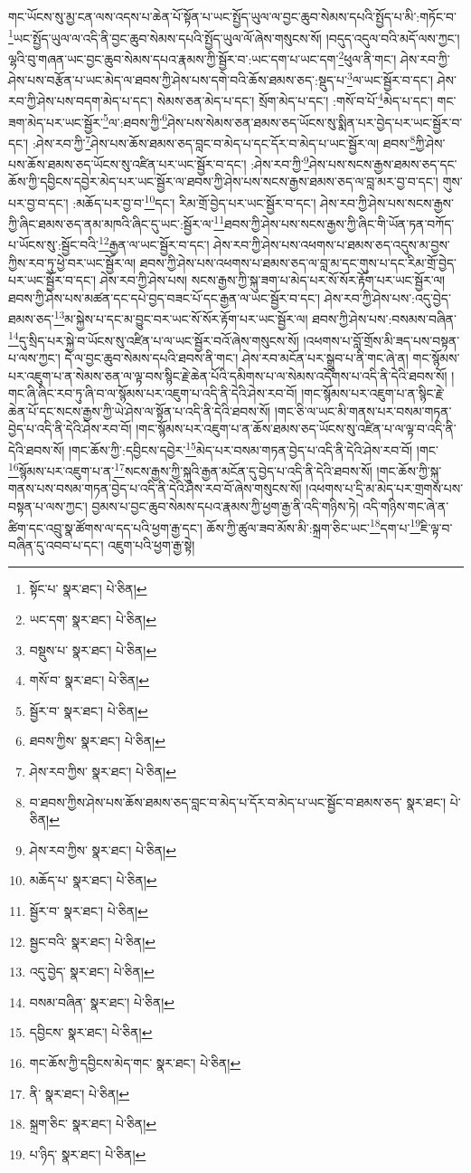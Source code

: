 གང་ཡོངས་སུ་མྱ་ངན་ལས་འདས་པ་ཆེན་པོ་སྟོན་པ་ཡང་སྤྱོད་ཡུལ་ལ་བྱང་ཆུབ་སེམས་དཔའི་སྤྱོད་པ་མི་:གཏོང་བ་\footnote{སྟོང་པ་  སྣར་ཐང་།  པེ་ཅིན། }ཡང་སྤྱོད་ཡུལ་ལ་འདི་ནི་བྱང་ཆུབ་སེམས་དཔའི་སྤྱོད་ཡུལ་ལོ་ཞེས་གསུངས་སོ། །བདུད་འདུལ་བའི་མདོ་ལས་ཀྱང་། ལྷའི་བུ་གཞན་ཡང་བྱང་ཆུབ་སེམས་དཔའ་རྣམས་ཀྱི་སྦྱོར་བ་:ཡང་དག་པ་ཡང་དག་\footnote{ཡང་དག་  སྣར་ཐང་།  པེ་ཅིན། }ཕུལ་ནི་གང་། ཤེས་རབ་ཀྱི་ཤེས་པས་བརྩོན་པ་ཡང་མེད་ལ་ཐབས་ཀྱི་ཤེས་པས་དགེ་བའི་ཆོས་ཐམས་ཅད་:སྡུད་པ་\footnote{བསྡུས་པ་  སྣར་ཐང་།  པེ་ཅིན། }ལ་ཡང་སྦྱོར་བ་དང་། ཤེས་རབ་ཀྱི་ཤེས་པས་བདག་མེད་པ་དང་། སེམས་ཅན་མེད་པ་དང་། སྲོག་མེད་པ་དང་། :གསོ་བ་པོ་\footnote{གསོ་བ་  སྣར་ཐང་།  པེ་ཅིན། }མེད་པ་དང་། གང་ཟག་མེད་པར་ཡང་སྦྱོར་\footnote{སྦྱོར་བ་  སྣར་ཐང་།  པེ་ཅིན། }ལ་:ཐབས་ཀྱི་\footnote{ཐབས་ཀྱིས་  སྣར་ཐང་།  པེ་ཅིན། }ཤེས་པས་སེམས་ཅན་ཐམས་ཅད་ཡོངས་སུ་སྨིན་པར་བྱེད་པར་ཡང་སྦྱོར་བ་དང་། :ཤེས་རབ་ཀྱི་\footnote{ཤེས་རབ་ཀྱིས་  སྣར་ཐང་།  པེ་ཅིན། }ཤེས་པས་ཆོས་ཐམས་ཅད་བླང་བ་མེད་པ་དང་དོར་བ་མེད་པ་ཡང་སྦྱོར་ལ། ཐབས་\footnote{བ་ཐབས་ཀྱིས་ཤེས་པས་ཆོས་ཐམས་ཅད་བླང་བ་མེད་པ་དོར་བ་མེད་པ་ཡང་སྦྱོང་བ་ཐམས་ཅད་  སྣར་ཐང་།  པེ་ཅིན། }ཀྱི་ཤེས་པས་ཆོས་ཐམས་ཅད་ཡོངས་སུ་འཛིན་པར་ཡང་སྦྱོར་བ་དང་། :ཤེས་རབ་ཀྱི་\footnote{ཤེས་རབ་ཀྱིས་  སྣར་ཐང་།  པེ་ཅིན། }ཤེས་པས་སངས་རྒྱས་ཐམས་ཅད་དང་ཆོས་ཀྱི་དབྱིངས་དབྱེར་མེད་པར་ཡང་སྦྱོར་ལ་ཐབས་ཀྱི་ཤེས་པས་སངས་རྒྱས་ཐམས་ཅད་ལ་བླ་མར་བྱ་བ་དང་། གུས་པར་བྱ་བ་དང་། :མཆོད་པར་བྱ་བ་\footnote{མཆོད་པ་  སྣར་ཐང་།  པེ་ཅིན། }དང་། རིམ་གྲོ་བྱེད་པར་ཡང་སྦྱོར་བ་དང་། ཤེས་རབ་ཀྱི་ཤེས་པས་སངས་རྒྱས་ཀྱི་ཞིང་ཐམས་ཅད་ནམ་མཁའི་ཞིང་དུ་ཡང་:སྦྱོར་ལ་\footnote{སྦྱོར་བ་  སྣར་ཐང་།  པེ་ཅིན། }ཐབས་ཀྱི་ཤེས་པས་སངས་རྒྱས་ཀྱི་ཞིང་གི་ཡོན་ཏན་བཀོད་པ་ཡོངས་སུ་:སྦྱོང་བའི་\footnote{སྦྱང་བའི་  སྣར་ཐང་།  པེ་ཅིན། }རྒྱན་ལ་ཡང་སྦྱོར་བ་དང་། ཤེས་རབ་ཀྱི་ཤེས་པས་འཕགས་པ་ཐམས་ཅད་འདུས་མ་བྱས་ཀྱིས་རབ་ཏུ་ཕྱེ་བར་ཡང་སྦྱོར་ལ། ཐབས་ཀྱི་ཤེས་པས་འཕགས་པ་ཐམས་ཅད་ལ་བླ་མ་དང་གུས་པ་དང་རིམ་གྲོ་བྱེད་པར་ཡང་སྦྱོར་བ་དང་། ཤེས་རབ་ཀྱི་ཤེས་པས། སངས་རྒྱས་ཀྱི་སྐུ་ཟག་པ་མེད་པར་སོ་སོར་རྟོག་པར་ཡང་སྦྱོར་ལ། ཐབས་ཀྱི་ཤེས་པས་མཚན་དང་དཔེ་བྱད་བཟང་པོ་དང་རྒྱན་ལ་ཡང་སྦྱོར་བ་དང་། ཤེས་རབ་ཀྱི་ཤེས་པས་:འདུ་བྱེད་ཐམས་ཅད་\footnote{འདུ་བྱེད་  སྣར་ཐང་།  པེ་ཅིན། }མ་སྐྱེས་པ་དང་མ་བྱུང་བར་ཡང་སོ་སོར་རྟོག་པར་ཡང་སྦྱོར་ལ། ཐབས་ཀྱི་ཤེས་པས་:བསམས་བཞིན་\footnote{བསམ་བཞིན་  སྣར་ཐང་།  པེ་ཅིན། }དུ་སྲིད་པར་སྐྱེ་བ་ཡོངས་སུ་འཛིན་པ་ལ་ཡང་སྦྱོར་བའོ་ཞེས་གསུངས་སོ། །འཕགས་པ་བློ་གྲོས་མི་ཟད་པས་བསྟན་པ་ལས་ཀྱང་། དེ་ལ་བྱང་ཆུབ་སེམས་དཔའི་ཐབས་ནི་གང་། ཤེས་རབ་མངོན་པར་སྒྲུབ་པ་ནི་གང་ཞེ་ན། གང་སྙོམས་པར་འཇུག་པ་ན་སེམས་ཅན་ལ་ལྟ་བས་སྙིང་རྗེ་ཆེན་པོའི་དམིགས་པ་ལ་སེམས་འདོགས་པ་འདི་ནི་དེའི་ཐབས་སོ། །གང་ཞི་ཞིང་རབ་ཏུ་ཞི་བ་ལ་སྙོམས་པར་འཇུག་པ་འདི་ནི་དེའི་ཤེས་རབ་བོ། །གང་སྙོམས་པར་འཇུག་པ་ན་སྙིང་རྗེ་ཆེན་པོ་དང་སངས་རྒྱས་ཀྱི་ཡེ་ཤེས་ལ་སྟོན་པ་འདི་ནི་དེའི་ཐབས་སོ། །གང་ཅི་ལ་ཡང་མི་གནས་པར་བསམ་གཏན་བྱེད་པ་འདི་ནི་དེའི་ཤེས་རབ་བོ། །གང་སྙོམས་པར་འཇུག་པ་ན་ཆོས་ཐམས་ཅད་ཡོངས་སུ་འཛིན་པ་ལ་ལྟ་བ་འདི་ནི་དེའི་ཐབས་སོ། །གང་ཆོས་ཀྱི་:དབྱིངས་དབྱེར་\footnote{དབྱིངས་  སྣར་ཐང་།  པེ་ཅིན། }མེད་པར་བསམ་གཏན་བྱེད་པ་འདི་ནི་དེའི་ཤེས་རབ་བོ། །གང་\footnote{གང་ཆོས་ཀྱི་དབྱིངས་མེད་གང་  སྣར་ཐང་།  པེ་ཅིན། }སྙོམས་པར་འཇུག་པ་ན་\footnote{ནི་  སྣར་ཐང་།  པེ་ཅིན། }སངས་རྒྱས་ཀྱི་སྐུའི་རྒྱན་མངོན་དུ་བྱེད་པ་འདི་ནི་དེའི་ཐབས་སོ། །གང་ཆོས་ཀྱི་སྐུ་གནས་པས་བསམ་གཏན་བྱེད་པ་འདི་ནི་དེའི་ཤེས་རབ་བོ་ཞེས་གསུངས་སོ། །འཕགས་པ་དྲི་མ་མེད་པར་གྲགས་པས་བསྟན་པ་ལས་ཀྱང་། བྱམས་པ་བྱང་ཆུབ་སེམས་དཔའ་རྣམས་ཀྱི་ཕྱག་རྒྱ་ནི་འདི་གཉིས་ཏེ། འདི་གཉིས་གང་ཞེ་ན་ཚིག་དང་འབྲུ་སྣ་ཚོགས་ལ་དད་པའི་ཕྱག་རྒྱ་དང་། ཆོས་ཀྱི་ཚུལ་ཟབ་མོས་མི་:སྐྲག་ཅིང་ཡང་\footnote{སྐྲག་ཅིང་  སྣར་ཐང་།  པེ་ཅིན། }དག་པ་\footnote{པ་ཉིད་  སྣར་ཐང་།  པེ་ཅིན། }ཇི་ལྟ་བ་བཞིན་དུ་འབབ་པ་དང་། འཇུག་པའི་ཕྱག་རྒྱ་སྟེ། 